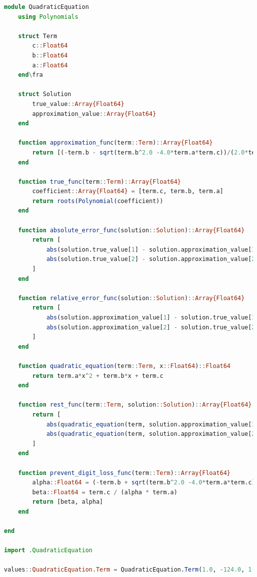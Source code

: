\documentclass[uplatex, dvipdfmx, a4j,11pt]{jsarticle}
\begin{document}
\begin{lstlisting}[title={実行結果}, label=code:in, language=Julia]
module QuadraticEquation
    using Polynomials

    struct Term
        c::Float64
        b::Float64
        a::Float64
    end\fra

    struct Solution
        true_value::Array{Float64}
        approximation_value::Array{Float64}
    end

    function approximation_func(term::Term)::Array{Float64}
        return [(-term.b - sqrt(term.b^2.0 -4.0*term.a*term.c))/(2.0*term.a), (-term.b + sqrt(term.b^2.0 -4.0*term.a*term.c))/(2.0*term.a)]
    end

    function true_func(term::Term)::Array{Float64}
        coefficient::Array{Float64} = [term.c, term.b, term.a]
        return roots(Polynomial(coefficient))
    end

    function absolute_error_func(solution::Solution)::Array{Float64}
        return [
            abs(solution.true_value[1] - solution.approximation_value[1]),
            abs(solution.true_value[2] - solution.approximation_value[2])
        ]
    end

    function relative_error_func(solution::Solution)::Array{Float64}
        return [
            abs(solution.approximation_value[1] - solution.true_value[1]) / abs(solution.true_value[1]),
            abs(solution.approximation_value[2] - solution.true_value[2]) / abs(solution.true_value[2]),
        ]
    end

    function quadratic_equation(term::Term, x::Float64)::Float64
        return term.a*x^2 + term.b*x + term.c
    end

    function rest_func(term::Term, solution::Solution)::Array{Float64}
        return [
            abs(quadratic_equation(term, solution.approximation_value[1]) - quadratic_equation(term, solution.true_value[1])),
            abs(quadratic_equation(term, solution.approximation_value[2]) - quadratic_equation(term, solution.true_value[2])),
        ]
    end

    function prevent_digit_loss_func(term::Term)::Array{Float64}
        alpha::Float64 = (-term.b + sqrt(term.b^2.0 -4.0*term.a*term.c))/(2.0*term.a)
        beta::Float64 = term.c / (alpha * term.a)
        return [beta, alpha]
    end

end

import .QuadraticEquation

values::QuadraticEquation.Term = QuadraticEquation.Term(1.0, -124.0, 1.0)


\end{lstlisting}
\end{document}
